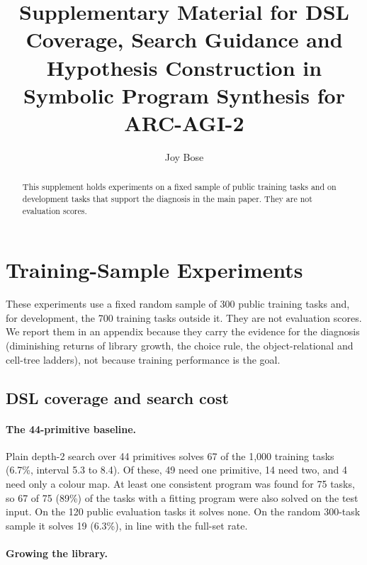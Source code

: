\documentclass[sigconf,nonacm]{acmart}
\begin{document}
\title{Supplementary Material for DSL Coverage, Search Guidance and Hypothesis Construction in Symbolic Program Synthesis for ARC-AGI-2}

\author{Joy Bose}

\begin{abstract}
This supplement holds experiments on a fixed sample of public training tasks and on development tasks that support the diagnosis in the main paper. They are not evaluation scores.
\end{abstract}
\maketitle
\renewcommand{\thesection}{S\arabic{section}}
\section{Training-Sample Experiments}\label{app:train}

These experiments use a fixed random sample of 300 public training tasks and, for development, the 700 training tasks outside it. They are not evaluation scores. We report them in an appendix because they carry the evidence for the diagnosis (diminishing returns of library growth, the choice rule, the object-relational and cell-tree ladders), not because training performance is the goal.

\subsection{DSL coverage and search cost}
\label{sec:small}

\paragraph{The 44-primitive baseline.}

Plain depth-2 search over 44 primitives solves 67 of the 1{,}000 training tasks (6.7\%, interval 5.3 to 8.4). Of these, 49 need one primitive, 14 need two, and 4 need only a colour map. At least one consistent program was found for 75 tasks, so 67 of 75 (89\%) of the tasks with a fitting program were also solved on the test input. On the 120 public evaluation tasks it solves none. On the random 300-task sample it solves 19 (6.3\%), in line with the full-set rate.

\paragraph{Growing the library.}
\end{document}
